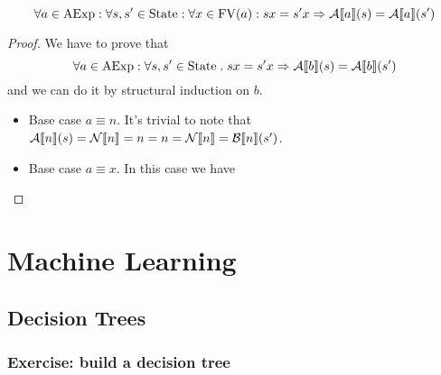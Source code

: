 \documentclass[12pt,a4paper,oneside]{book}
\begin{document}
\begin{lemma}
	\label{ex_1_12_lemma}
	\[
	\forall a \in \mathrm{AExp} \mathrel{:} \forall s, s' \in \mathrm{State} \mathrel{:} \forall x \in \mathrm{FV}(a) \mathrel{:} sx = s'x \Rightarrow \mathcal{A} \llbracket a \rrbracket (s) = \mathcal{A} \llbracket a \rrbracket (s')
	\]
	
	\begin{proof}
		We have to prove that
		\[
		\forall a \in \mathrm{AExp} \mathrel{:} \forall s, s' \in \mathrm{State} \mathrel{.} sx = s'x \Rightarrow \mathcal{A} \llbracket b \rrbracket (s) = \mathcal{A} \llbracket b \rrbracket (s')
		\]
		and we can do it by structural induction on $b$.
		
		\begin{itemize}
			\item Base case $a \equiv n$. It's trivial to note that $\mathcal{A} \llbracket n \rrbracket (s) = \mathcal{N} \llbracket n \rrbracket = n = n = \mathcal{N} \llbracket n \rrbracket = \mathcal{B} \llbracket n \rrbracket (s')$.
			\item Base case $a \equiv x$. In this case we have
		\end{itemize}
	\end{proof}
\end{lemma}

\chapter{Machine Learning}

\section{Decision Trees}

\subsection{Exercise: build a decision tree}
\end{document}
